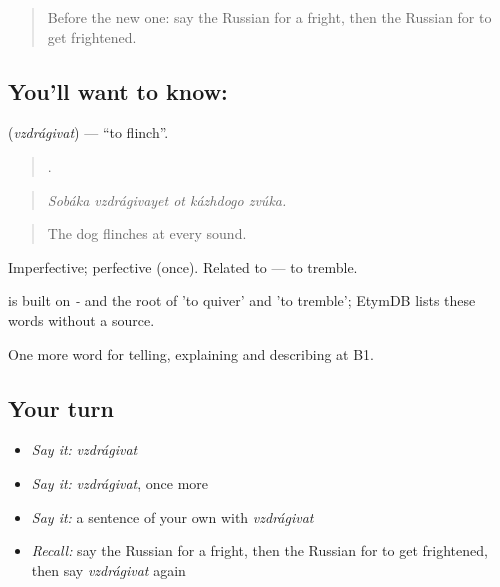 \label{lesson:RU-C476-vzdragivat}



\begin{quote}
Before the new one: say the Russian for a fright, then the Russian for to get frightened.
\end{quote}

\subsection*{You'll want to know: }
\textbf{} (\emph{vzdrágivat}) — \textquotedblleft{}to flinch\textquotedblright{}.

\begin{quote}
    .
\end{quote}

\begin{quote}
\emph{Sobáka vzdrágivayet ot kázhdogo zvúka.}
\end{quote}

\begin{quote}
The dog flinches at every sound.
\end{quote}

Imperfective; perfective  (once). Related to \emph{} — to tremble.

\begin{cousinweb}
\emph{} is built on \emph{-} and the root of \emph{} 'to quiver' and \emph{} 'to tremble'; EtymDB lists these words without a source.
\end{cousinweb}

\begin{grammarlens}[title={What you've built}]
One more word for telling, explaining and describing at B1.
\end{grammarlens}

\subsection*{Your turn}
\begin{itemize}
\raggedright
  \item \emph{Say it:} \emph{vzdrágivat}
  \item \emph{Say it:} \emph{vzdrágivat}, once more
  \item \emph{Say it:} a sentence of your own with \emph{vzdrágivat}
  \item \emph{Recall:} say the Russian for a fright, then the Russian for to get frightened, then say \emph{vzdrágivat} again
\end{itemize}


